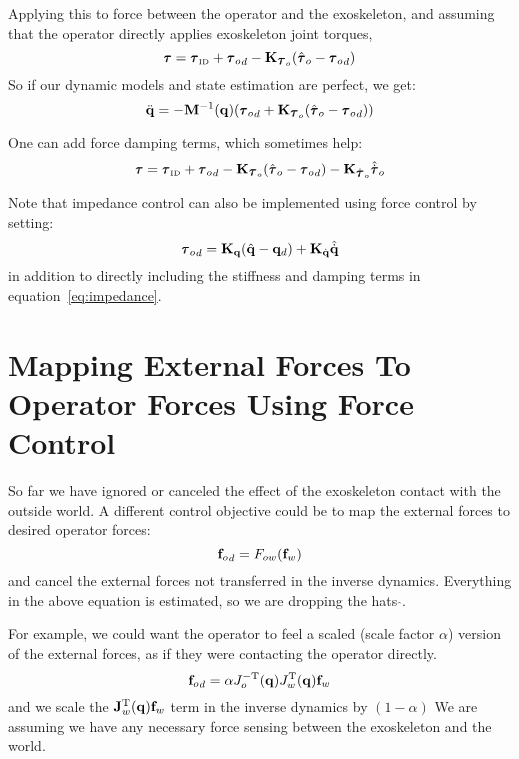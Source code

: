 \documentclass[letterpaper,12pt,fullpage]{article}
\newcommand{\invdyn}{{\mbox {\tiny ID}}}
\begin{document}
Applying this to force between the operator and the exoskeleton, and assuming
that the operator directly applies exoskeleton joint torques,
\begin{equation}
\vtau = \vtau_{\invdyn} + {\vtau_o}_d - \mK_{\vtau_o} ( \hat{\vtau}_o - {\vtau_o}_d )
\end{equation}
So if our dynamic models and state estimation are perfect, we get:
\begin{equation}
\ddot{\vq} = - \mM^{-1} (\vq) ({\vtau_o}_d + \mK_{\vtau_o} ( \hat{\vtau}_o - {\vtau_o}_d ))
\end{equation}

One can add force damping terms, which sometimes help:
\begin{equation}
\vtau = \vtau_{\invdyn} + {\vtau_o}_d - \mK_{\vtau_o} ( \hat{\vtau}_o - {\vtau_o}_d )
- \mK_{\dot{\vtau}_o} \hat{\dot{\vtau}}_o
\end{equation}

Note that impedance control can also be implemented using force control
by setting:
\begin{equation}
{\vtau_o}_d = \mK_{\vq}( \hat{\vq} - \vq_d ) + \mK_{\dot{\vq}} \hat{\dot{\vq}}
\end{equation}
in addition to directly including the stiffness and damping terms in
equation~\ref{eq:impedance}. 

\section{Mapping External Forces To Operator Forces Using Force Control}

So far we have ignored or canceled the effect of 
the exoskeleton contact with the outside world.
A different control objective could be to map the external forces to 
desired operator forces:
\begin{equation}
{{\bf f}_o}_d = F_{ow} ( {\bf f}_w )
\end{equation}
and cancel the external forces not transferred in the inverse dynamics.
Everything in the above equation is estimated, so we are dropping the hats 
$\hat{\mbox{}}$.

For example, we could want the operator to feel a scaled (scale factor $\alpha$) 
version of the external
forces, as if they were contacting the operator directly.
\begin{equation}
{{\bf f}_o}_d = \alpha J_o^{-{\rm T}}({\bf q}) J_w^{{\rm T}}({\bf q}) {\bf f}_w
\end{equation}
and we scale the ${\bf J}_w^{{\rm T}}({\bf q}) {\bf f}_w$ term in the inverse dynamics
by $(1-\alpha)$
We are assuming we have any necessary force sensing between the exoskeleton and
the world.
\end{document}
